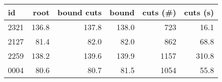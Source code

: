 \begin{tabular}{lrrrrr}
\toprule
   id &  root &  bound cuts &  bound &  cuts (\#) &  cuts (s) \\
\midrule
 2321 & 136.8 &       137.8 &  138.0 &       723 &      16.1 \\
 2127 &  81.4 &        82.0 &   82.0 &       862 &      68.8 \\
 2259 & 138.2 &       139.6 &  139.9 &      1157 &     310.8 \\
 0004 &  80.6 &        80.7 &   81.5 &      1054 &      55.8 \\
\bottomrule
\end{tabular}

